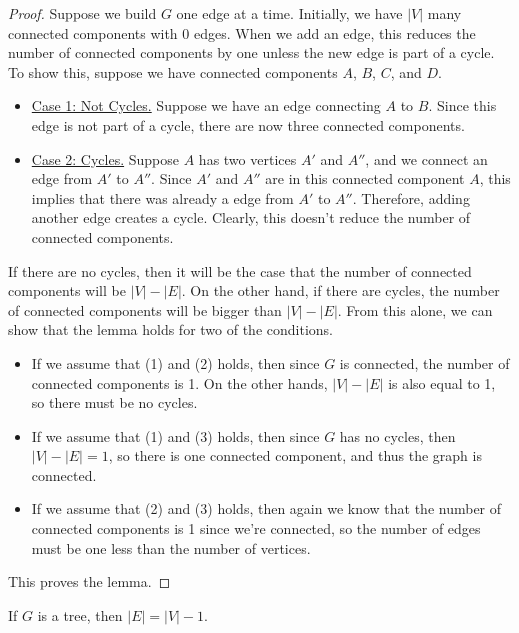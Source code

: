 \documentclass[letterpaper]{article}
\begin{document}
\begin{mdframed}[]
    \begin{proof}
        Suppose we build $G$ one edge at a time. Initially, we have $|V|$ many connected components with 0 edges. When we add an edge, this reduces the number of connected components by one unless the new edge is part of a cycle. To show this, suppose we have connected components $A$, $B$, $C$, and $D$. 
        \begin{itemize}
            \item \underline{Case 1: Not Cycles.} Suppose we have an edge connecting $A$ to $B$. Since this edge is not part of a cycle, there are now three connected components.
            \item \underline{Case 2: Cycles.} Suppose $A$ has two vertices $A'$ and $A''$, and we connect an edge from $A'$ to $A''$. Since $A'$ and $A''$ are in this connected component $A$, this implies that there was already a edge from $A'$ to $A''$. Therefore, adding another edge creates a cycle. Clearly, this doesn't reduce the number of connected components. 
        \end{itemize}
        If there are no cycles, then it will be the case that the number of connected components will be $|V| - |E|$. On the other hand, if there are cycles, the number of connected components will be bigger than $|V| - |E|$. From this alone, we can show that the lemma holds for two of the conditions. 
        \begin{itemize}
            \item If we assume that (1) and (2) holds, then since $G$ is connected, the number of connected components is 1. On the other hands, $|V| - |E|$ is also equal to 1, so there must be no cycles. 
            \item If we assume that (1) and (3) holds, then since $G$ has no cycles, then $|V| - |E| = 1$, so there is one connected component, and thus the graph is connected.
            \item If we assume that (2) and (3) holds, then again we know that the number of connected components is 1 since we're connected, so the number of edges must be one less than the number of vertices.
        \end{itemize}
        This proves the lemma. 
    \end{proof}
\end{mdframed}

\begin{corollary}{}{}
    If $G$ is a tree, then $|E| = |V| - 1$. 
\end{corollary}
\end{document}
